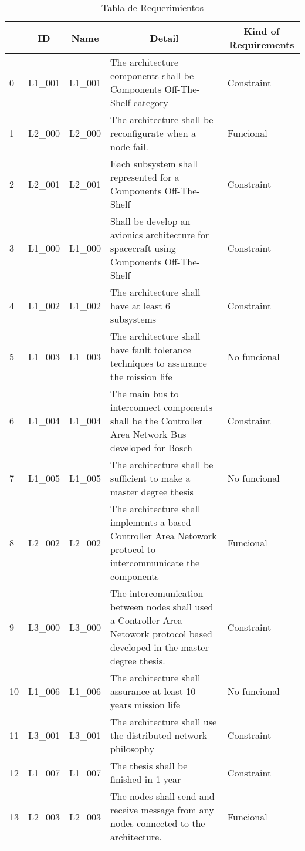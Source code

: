 \begin{table}[]
\small
\centering
\caption{Tabla de Requerimientos}
\label{table:Requerimientos}
\begin{tabular}{|l|l|l|p{7cm}|p{2cm}|}
\hline
\multicolumn{1}{|c|}{\textbf{}} & \multicolumn{1}{c|}{\textbf{ID}} & \multicolumn{1}{c|}{\textbf{Name}} & \multicolumn{1}{c|}{\textbf{Detail}} & \multicolumn{1}{c|}{\textbf{Kind of Requirements}} \\ \hline
0 & L1\_001 & L1\_001 & The architecture components shall be Components Off-The-Shelf category & Constraint \\ \hline
1 & L2\_000 & L2\_000 & The architecture shall be reconfigurate when a node fail. & Funcional \\ \hline
2 & L2\_001 & L2\_001 & Each subsystem shall represented for a Components Off-The-Shelf & Constraint \\ \hline
3 & L1\_000 & L1\_000 & Shall be develop an avionics architecture for spacecraft using Components Off-The-Shelf & Constraint \\ \hline
4 & L1\_002 & L1\_002 & The architecture shall have at least 6 subsystems & Constraint \\ \hline
5 & L1\_003 & L1\_003 & The architecture shall have fault tolerance techniques to assurance the mission life & No funcional \\ \hline
6 & L1\_004 & L1\_004 & The main bus to interconnect components shall be the Controller Area Network Bus developed for Bosch & Constraint \\ \hline
7 & L1\_005 & L1\_005 & The architecture shall be sufficient to make a master degree thesis & No funcional \\ \hline
8 & L2\_002 & L2\_002 & The architecture shall implements a based Controller Area Netowork protocol to intercommunicate the components & Funcional \\ \hline
9 & L3\_000 & L3\_000 & The intercomunication between nodes shall used a Controller Area Netowork protocol based developed in the master degree thesis. & Constraint\\ \hline
10 & L1\_006 & L1\_006 & The architecture shall assurance at least 10 years mission life & No funcional \\ \hline
11 & L3\_001 & L3\_001 & The architecture shall use the distributed network philosophy & Constraint \\ \hline
12 & L1\_007 & L1\_007 & The thesis shall be finished in 1 year & Constraint \\ \hline
13 & L2\_003 & L2\_003 & The nodes shall send and receive message from any nodes connected to the architecture. & Funcional \\ \hline
\end{tabular}%
\end{table}

